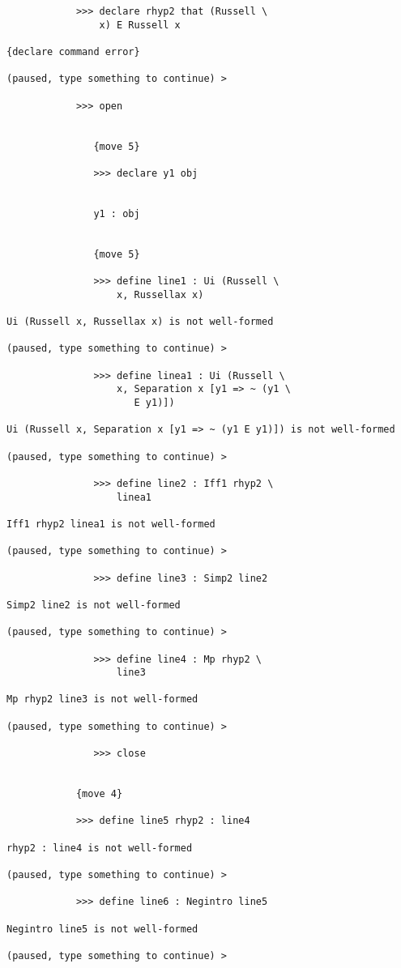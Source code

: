 \documentclass[12pt]{article}
\begin{document}
\begin{verbatim}
            >>> declare rhyp2 that (Russell \
                x) E Russell x

{declare command error}

(paused, type something to continue) >

            >>> open


               {move 5}

               >>> declare y1 obj


               y1 : obj


               {move 5}

               >>> define line1 : Ui (Russell \
                   x, Russellax x)

Ui (Russell x, Russellax x) is not well-formed

(paused, type something to continue) >

               >>> define linea1 : Ui (Russell \
                   x, Separation x [y1 => ~ (y1 \
                      E y1)])

Ui (Russell x, Separation x [y1 => ~ (y1 E y1)]) is not well-formed

(paused, type something to continue) >

               >>> define line2 : Iff1 rhyp2 \
                   linea1

Iff1 rhyp2 linea1 is not well-formed

(paused, type something to continue) >

               >>> define line3 : Simp2 line2

Simp2 line2 is not well-formed

(paused, type something to continue) >

               >>> define line4 : Mp rhyp2 \
                   line3

Mp rhyp2 line3 is not well-formed

(paused, type something to continue) >

               >>> close


            {move 4}

            >>> define line5 rhyp2 : line4

rhyp2 : line4 is not well-formed

(paused, type something to continue) >

            >>> define line6 : Negintro line5

Negintro line5 is not well-formed

(paused, type something to continue) >


\end{verbatim}
\end{document}
